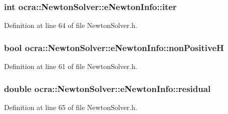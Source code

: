 \subsubsection[{\texorpdfstring{iter}{iter}}]{\setlength{\rightskip}{0pt plus 5cm}int ocra\+::\+Newton\+Solver\+::e\+Newton\+Info\+::iter}\hypertarget{structocra_1_1NewtonSolver_1_1eNewtonInfo_a3ec8816b36812a608542479168a9c18d}{}\label{structocra_1_1NewtonSolver_1_1eNewtonInfo_a3ec8816b36812a608542479168a9c18d}


Definition at line 64 of file Newton\+Solver.\+h.

\subsubsection[{\texorpdfstring{non\+PositiveH}{nonPositiveH}}]{\setlength{\rightskip}{0pt plus 5cm}bool ocra\+::\+Newton\+Solver\+::e\+Newton\+Info\+::non\+PositiveH}\hypertarget{structocra_1_1NewtonSolver_1_1eNewtonInfo_a088723d14881333ae7fcc9576c7142d0}{}\label{structocra_1_1NewtonSolver_1_1eNewtonInfo_a088723d14881333ae7fcc9576c7142d0}


Definition at line 61 of file Newton\+Solver.\+h.

\subsubsection[{\texorpdfstring{residual}{residual}}]{\setlength{\rightskip}{0pt plus 5cm}double ocra\+::\+Newton\+Solver\+::e\+Newton\+Info\+::residual}\hypertarget{structocra_1_1NewtonSolver_1_1eNewtonInfo_a5b0d53fdf4347e5bc6f4d1af784eb517}{}\label{structocra_1_1NewtonSolver_1_1eNewtonInfo_a5b0d53fdf4347e5bc6f4d1af784eb517}


Definition at line 65 of file Newton\+Solver.\+h.

